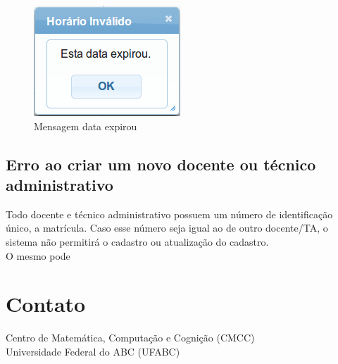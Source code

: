 \documentclass[openany,10pt,a4paper]{book}
\begin{document}
\begin{figure}[!htb]
    \centering
    \includegraphics[scale=0.45]{dataExpirou.png}
    \caption{Mensagem data expirou}
    \label{im_dataExpirou}
\end{figure}

\section{Erro ao criar um novo docente ou técnico administrativo}
Todo docente e técnico administrativo possuem um número de identificação único, a matrícula. Caso esse número seja igual ao de outro docente/TA, o sistema não permitirá o cadastro ou atualização do cadastro. \\
O mesmo pode


\chapter{Contato}
\centering 
Centro de Matemática, Computação e Cognição (CMCC)\\
Universidade Federal do ABC (UFABC)\\
\end{document}
